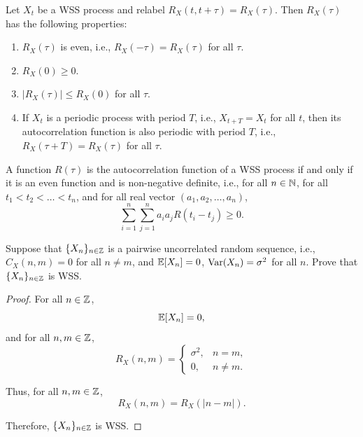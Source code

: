 \begin{proposition}
  Let \(X_t\) be a WSS process and relabel \(R_X(t, t + \tau) = R_X(\tau)\). Then \(R_X(\tau)\) has the following properties:
  \begin{enumerate}
    \item \(R_X(\tau)\) is even, i.e., \(R_X(-\tau) = R_X(\tau)\) for all \(\tau\).
    \item \(R_X(0) \geq 0\).
    \item \(|R_X(\tau)| \leq R_X(0)\) for all \(\tau\).
    \item If \(X_t\) is a periodic process with period \(T\), i.e., \(X_{t + T} = X_t\) for all \(t\), then its autocorrelation function is also periodic with period \(T\), i.e., \(R_X(\tau + T) = R_X(\tau)\) for all \(\tau\).
  \end{enumerate}
\end{proposition}

\begin{proposition}
  A function \(R(\tau)\) is the autocorrelation function of a WSS process if and only if it is an even function and is non-negative definite, i.e., for all \(n \in \mathbb{N}\), for all \(t_1 < t_2 < \dots < t_n\), and for all real vector \((a_1, a_2, \dots, a_n)\),
  \[
    \sum_{i = 1}^n \sum_{j = 1}^n a_i a_j R(t_i - t_j) \geq 0.
  \]
\end{proposition}

\begin{example}
  Suppose that \(\{X_n\}_{n \in \mathbb{Z}}\) is a pairwise uncorrelated random sequence, i.e., \(C_X(n, m) = 0\) for all \(n \neq m\), and \(\mathbb{E}[X_n] = 0\), \(\mathrm{Var}(X_n) = \sigma^2\) for all \(n\). Prove that \(\{X_n\}_{n \in \mathbb{Z}}\) is WSS.
\end{example}
\begin{proof}
  For all \(n \in \mathbb{Z}\),
  \[
    \mathbb{E}[X_n] = 0,
  \]
  and for all \(n, m \in \mathbb{Z}\),
  \[
    R_X(n, m) = \begin{cases}
      \sigma^2, & n = m, \\
      0, & n \neq m.
    \end{cases}
  \]
  
  Thus, for all \(n, m \in \mathbb{Z}\),
  \[
    R_X(n, m) = R_X(|n - m|).
  \]
  
  Therefore, \(\{X_n\}_{n \in \mathbb{Z}}\) is WSS.
\end{proof}

